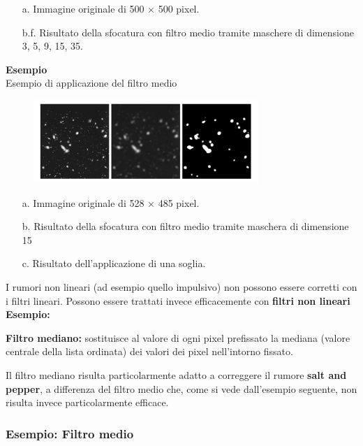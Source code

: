 \begin{enumerate}
    \item [a.] Immagine originale di 500 × 500 pixel.
    \item [b.f.] Risultato della sfocatura con filtro medio tramite maschere di
          dimensione 3, 5, 9, 15, 35.
\end{enumerate}
\textbf{Esempio}
\\
Esempio di applicazione del filtro medio
\begin{figure}[H]
    \centering
    \includegraphics[width=\linewidth, keepaspectratio]{capitoli/immagini/imgs/filtro-l-esempio2.png}
\end{figure}

\begin{enumerate}
    \item [a.] Immagine originale di 528 × 485 pixel.
    \item [b.] Risultato della sfocatura con filtro medio tramite maschera di dimensione 15
    \item [c.]  Risultato dell'applicazione di una soglia.
\end{enumerate}
I rumori non lineari (ad esempio quello impulsivo) non possono essere corretti con i filtri lineari.
Possono essere trattati invece efficacemente con \textbf{filtri non lineari}
\\
\textbf{Esempio:}
\begin{trivlist}
    \item \textbf{Filtro mediano:}  sostituisce al valore di ogni pixel prefissato la
    mediana (valore centrale della lista ordinata) dei
    valori dei pixel nell'intorno fissato.
\end{trivlist}
Il filtro mediano risulta particolarmente adatto a correggere il rumore \textbf{salt and pepper}, a differenza del filtro medio che, come si
vede dall'esempio seguente, non risulta invece particolarmente efficace.

\subsubsection{Esempio: Filtro medio}

